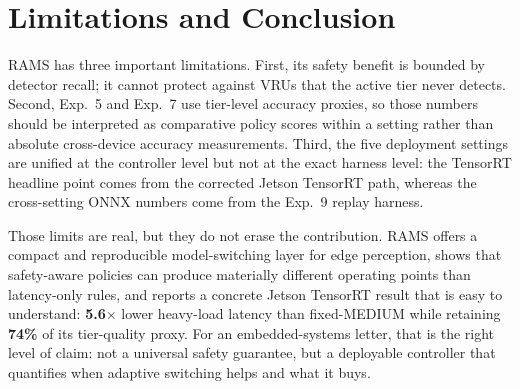 \documentclass[10pt,journal]{IEEEtran}
\newcommand{\rams}{RAMS}
\begin{document}
\section{Limitations and Conclusion}
\rams{} has three important limitations. First, its safety benefit is bounded by detector recall; it cannot protect against VRUs that the active tier never detects. Second, Exp.~5 and Exp.~7 use tier-level accuracy proxies, so those numbers should be interpreted as comparative policy scores within a setting rather than absolute cross-device accuracy measurements. Third, the five deployment settings are unified at the controller level but not at the exact harness level: the TensorRT headline point comes from the corrected Jetson TensorRT path, whereas the cross-setting ONNX numbers come from the Exp.~9 replay harness.

Those limits are real, but they do not erase the contribution. \rams{} offers a compact and reproducible model-switching layer for edge perception, shows that safety-aware policies can produce materially different operating points than latency-only rules, and reports a concrete Jetson TensorRT result that is easy to understand: \textbf{5.6$\times$} lower heavy-load latency than fixed-MEDIUM while retaining \textbf{74\%} of its tier-quality proxy. For an embedded-systems letter, that is the right level of claim: not a universal safety guarantee, but a deployable controller that quantifies when adaptive switching helps and what it buys.

\balance


\end{document}
